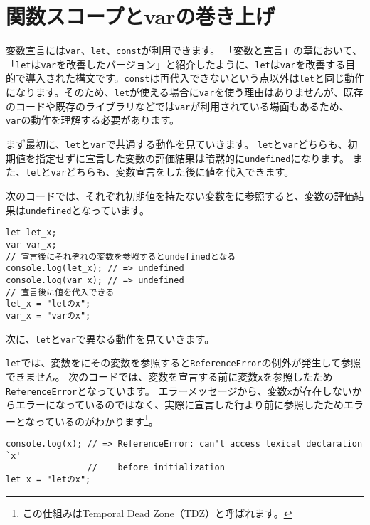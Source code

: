 \hypertarget{hoisting-var}{%
\section{関数スコープとvarの巻き上げ}\label{hoisting-var}}

変数宣言には\texttt{var}、\texttt{let}、\texttt{const}が利用できます。
「\hyperlink{variable-and-declaration}{変数と宣言}」の章において、「\texttt{let}は\texttt{var}を改善したバージョン」と紹介したように、\texttt{let}は\texttt{var}を改善する目的で導入された構文です。\texttt{const}は再代入できないという点以外は\texttt{let}と同じ動作になります。そのため、\texttt{let}が使える場合に\texttt{var}を使う理由はありませんが、既存のコードや既存のライブラリなどでは\texttt{var}が利用されている場面もあるため、\texttt{var}の動作を理解する必要があります。

まず最初に、\texttt{let}と\texttt{var}で共通する動作を見ていきます。
\texttt{let}と\texttt{var}どちらも、初期値を指定せずに宣言した変数の評価結果は暗黙的に\texttt{undefined}になります。
また、\texttt{let}と\texttt{var}どちらも、変数宣言をした後に値を代入できます。

次のコードでは、それぞれ初期値を持たない変数を\textbf{}に参照すると、変数の評価結果は\texttt{undefined}となっています。

\begin{lstlisting}
let let_x;
var var_x;
// 宣言後にそれぞれの変数を参照するとundefinedとなる
console.log(let_x); // => undefined
console.log(var_x); // => undefined
// 宣言後に値を代入できる
let_x = "letのx";
var_x = "varのx";
\end{lstlisting}

次に、\texttt{let}と\texttt{var}で異なる動作を見ていきます。

\texttt{let}では、変数を\textbf{}にその変数を参照すると\texttt{ReferenceError}の例外が発生して参照できません。
次のコードでは、変数を宣言する前に変数\texttt{x}を参照したため\texttt{ReferenceError}となっています。
エラーメッセージから、変数\texttt{x}が存在しないからエラーになっているのではなく、実際に宣言した行より前に参照したためエラーとなっているのがわかります\footnote{この仕組みはTemporal
  Dead Zone（TDZ）と呼ばれます。}。

\begin{lstlisting}
console.log(x); // => ReferenceError: can't access lexical declaration `x' 
                //    before initialization
let x = "letのx";
\end{lstlisting}

